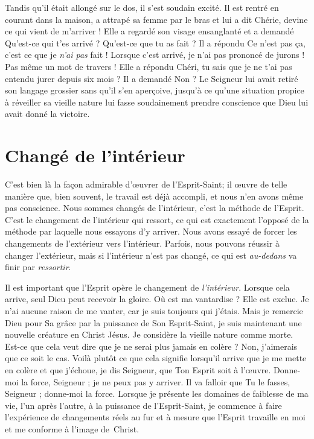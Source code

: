 Tandis qu'il était allongé sur le dos, il s'est soudain excité.
 Il est rentré en courant dans la maison, a attrapé sa femme par le bras et lui a dit\frcolon{}
 \Og Chérie, devine ce qui vient de m'arriver ! \Fg{}
 Elle a regardé son visage ensanglanté et a demandé\frcolon{}
 \Og Qu'est-ce qui t'es arrivé ? Qu'est-ce que tu as fait ? \Fg{}
 Il a répondu\frcolon{}
 \Og Ce n'est pas ça, c'est ce que je \emph{n'ai pas} fait !
 Lorsque c'est arrivé, je n'ai pas prononcé de jurons ! Pas même un mot de travers ! \Fg{}
 Elle a répondu\frcolon{}
 \Og Chéri, tu sais que je ne t'ai pas entendu jurer depuis six mois ? \Fg{}
 Il a demandé\frcolon{} \Og Non ? \Fg{}
 Le Seigneur lui avait retiré son langage grossier sans qu'il s'en aperçoive,
 jusqu'à ce qu'une situation propice à réveiller sa vieille nature
 lui fasse soudainement prendre conscience
 que Dieu lui avait donné la victoire.


\section{Chang\'e de l'int\'erieur}

C'est bien là la façon admirable d'œuvrer de l'Esprit-Saint;
 il \oe{}uvre de telle manière que, bien souvent,
 le travail est déjà accompli, et nous n'en avons même pas conscience.
 Nous sommes changés de l'intérieur, c'est la méthode de l'Esprit.
 C'est le changement de l'intérieur qui ressort,
 ce qui est exactement l'opposé de la méthode par laquelle
 nous essayons d'y arriver.
 Nous avons essayé de forcer les changements de l'extérieur
 vers l'intérieur.
 Parfois, nous pouvons réussir à changer l'extérieur,
 mais si l'intérieur n'est pas changé,
 ce qui est \emph{au-dedans} va finir par \emph{ressortir}.

Il est important que l'Esprit opère le changement de \emph{l'intérieur}.
 Lorsque cela arrive, seul Dieu peut recevoir la gloire.
 Où est ma vantardise ? Elle est exclue.
 Je n'ai aucune raison de me vanter, car je suis toujours qui j'étais.
 Mais je remercie Dieu pour Sa grâce\frcolon{} par la puissance de Son Esprit-Saint,
 je suis maintenant une nouvelle créature en Christ Jésus.
 Je considère la vieille nature comme morte.
 Est-ce que cela veut dire que je ne serai plus jamais en colère ?
 Non, j'aimerais que ce soit le cas.
 Voilà plutôt ce que cela signifie\frcolon{} lorsqu'il arrive que je me mette en colère
 et que j'échoue, je dis\frcolon{}
 \Og Seigneur, que Ton Esprit soit à l'œuvre. Donne-moi la force,
 Seigneur ; je ne peux pas y arriver. Il va falloir que Tu le fasses,
 Seigneur ; donne-moi la force. \Fg{}
 Lorsque je présente les domaines de faiblesse de ma vie, l'un après l'autre,
 à la puissance de l'Esprit-Saint, je commence à faire
 l'expérience  de changements réels au fur et à mesure
 que l'Esprit travaille en moi et me conforme à l'image de~Christ.


